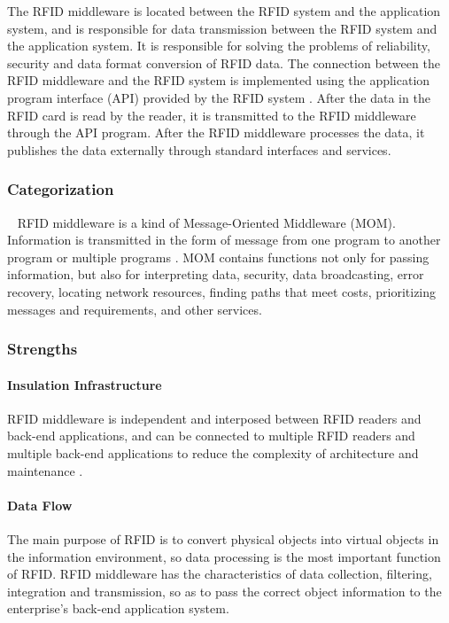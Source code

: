 \documentclass[conference]{IEEEtran}
\begin{document}
The RFID middleware is located between the RFID system and the application system, and is responsible for data transmission between the RFID system and the application system.
It is responsible for solving the problems of reliability, security and data format conversion of RFID data.
The connection between the RFID middleware and the RFID system is implemented using the application program interface (API) provided by the RFID system \cite{b8}. After the data in the RFID card is read by the reader, it is transmitted to the RFID middleware through the API program. After the RFID middleware processes the data, it publishes the data externally through standard interfaces and services.

\subsubsection{Categorization}
\
\newline
\indent
RFID middleware is a kind of Message-Oriented Middleware (MOM). Information is transmitted in the form of message from one program to another program or multiple programs \cite{b9}. MOM contains functions not only for passing information, but also for interpreting data, security, data broadcasting, error recovery, locating network resources, finding paths that meet costs, prioritizing messages and requirements, and other services.

\subsubsection{Strengths}

\paragraph{Insulation Infrastructure}
RFID middleware is independent and interposed between RFID readers and back-end applications, and can be connected to multiple RFID readers and multiple back-end applications to reduce the complexity of architecture and maintenance \cite{b10}.

\paragraph{Data Flow}
The main purpose of RFID is to convert physical objects into virtual objects in the information environment, so data processing is the most important function of RFID. RFID middleware has the characteristics of data collection, filtering, integration and transmission, so as to pass the correct object information to the enterprise's back-end application system.
\end{document}
